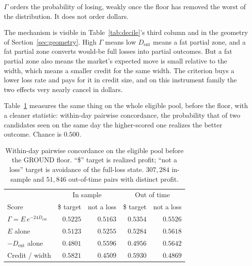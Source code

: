 \documentclass[11pt]{article}
\newcommand{\dent}{D_{\mathrm{ent}}}
\begin{document}
$\Gamma$ orders the probability of losing, weakly once the floor has removed
the worst of the distribution. It does not order dollars.

The mechanism is visible in Table~\ref{tab:decile}'s third column and in the
geometry of Section~\ref{sec:geometry}. High $\Gamma$ means low $\dent$ means
a fat partial zone, and a fat partial zone converts would-be full losses into
partial outcomes. But a fat partial zone also means the market's expected move
is small relative to the width, which means a smaller credit for the same
width. The criterion buys a lower loss rate and pays for it in credit size,
and on this instrument family the two effects very nearly cancel in dollars.

Table~\ref{tab:conc} measures the same thing on the whole eligible pool, before
the floor, with a cleaner statistic: within-day pairwise concordance, the
probability that of two candidates seen on the same day the higher-scored one
realizes the better outcome. Chance is $0.500$.

\begin{table}[h]
\centering
\caption{Within-day pairwise concordance on the eligible pool before the GROUND
floor. ``\$'' target is realized profit; ``not a loss'' target is avoidance of
the full-loss state. $307{,}284$ in-sample and $51{,}846$ out-of-time pairs
with distinct profit.}
\label{tab:conc}
\begin{tabular}{lrrrr}
\toprule
 & \multicolumn{2}{c}{In sample} & \multicolumn{2}{c}{Out of time} \\
\cmidrule(lr){2-3}\cmidrule(lr){4-5}
Score & \$ target & not a loss & \$ target & not a loss \\
\midrule
$\Gamma = E\,e^{-24\dent}$ & $0.5225$ & $0.5163$ & $0.5354$ & $0.5526$ \\
$E$ alone                  & $0.5123$ & $0.5255$ & $0.5284$ & $0.5618$ \\
$-\dent$ alone             & $\mathit{0.4801}$ & $\mathbf{0.5596}$ & $\mathit{0.4956}$ & $\mathbf{0.5642}$ \\
Credit / width             & $\mathbf{0.5821}$ & $\mathit{0.4509}$ & $\mathbf{0.5930}$ & $\mathit{0.4869}$ \\
\bottomrule
\end{tabular}
\end{table}
\end{document}
